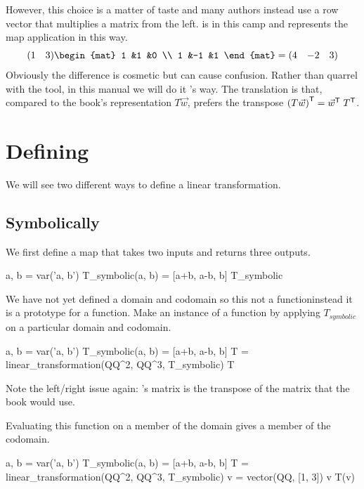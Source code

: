 However, this choice is a matter of taste and many authors instead
use a row vector that multiplies a matrix from the left.
\Sage{} is in this camp and
represents the map application in this way.
\begin{equation*}
  \rowvec{1 &3}
  \begin{mat}
    1 &1  &0 \\
    1 &-1 &1
  \end{mat}
  =
  \rowvec{4 &-2 &3}
\end{equation*}
Obviously the difference is cosmetic but can cause confusion.
Rather than quarrel with the tool, in this manual we will do it
\Sage's way.
The translation is that, compared to the book's representation $T\vec{w}$,
\Sage{} prefers the transpose
${{(T\vec{w})}^{\textsf{T}}}={{\vec{w}}^{\textsf{T}}}\;{{T}^{\textsf{T}}}$.



  

\section{Defining}
We will see two different ways to define a linear transformation.

\subsection{Symbolically}
We first define a map that takes two inputs and returns three outputs.
\begin{sageoutput}
a, b = var('a, b')   
T_symbolic(a, b) = [a+b, a-b, b]         
T_symbolic       
\end{sageoutput}
We have not yet defined a domain and codomain 
so this not a function\Dash instead it is a prototype for a function.
Make an instance of a function by applying $T_{\textit{symbolic}}$ on a 
particular domain and codomain.  %
\begin{sageoutput}[d,0,2] 
a, b = var('a, b')   
T_symbolic(a, b) = [a+b, a-b, b]         
T = linear_transformation(QQ^2, QQ^3, T_symbolic)
T                                              
\end{sageoutput}
\noindent Note the left/right issue again: \Sage's matrix is the transpose of
the matrix that the book would use.

Evaluating this function on a member of the domain gives a member
of the codomain. 
\begin{sageoutput}[d,0,3]
a, b = var('a, b')   
T_symbolic(a, b) = [a+b, a-b, b]         
T = linear_transformation(QQ^2, QQ^3, T_symbolic)
v = vector(QQ, [1, 3])  
v
T(v)
\end{sageoutput}

